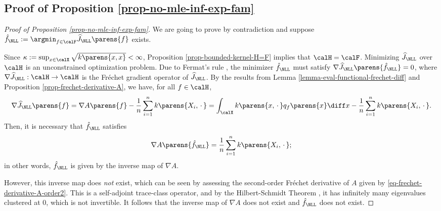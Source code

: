 \documentclass[12pt]{article}
\theoremstyle{definition}
\theoremstyle{theorem}
\theoremstyle{remark}
\begin{document}
\subsection{Proof of Proposition \ref{prop-no-mle-inf-exp-fam}}\label{subsection-proof-prop-no-mle-inf-exp-fam}

\begin{proof}[Proof of Proposition \ref{prop-no-mle-inf-exp-fam}]
	
	We are going to prove by contradiction and suppose $\hat{f}_{\NLL} := \argmin_{f \in \calF} \widehat{J}_{\NLL} \parens{f}$ exists. 
	
	Since $\kappa := \sup_{x \in \calX} \sqrt{k \parens{x, x}} < \infty$, Proposition \ref{prop-bounded-kernel-H=F} implies that $\calH = \calF$. Minimizing $\widehat{J}_{\NLL}$ over $\calH$ is an unconstrained optimization problem. Due to Fermat's rule \parencites[Theorem 16.3 in][]{Bauschke2017-he}, the minimizer $\hat{f}_{\NLL}$ must satisfy $\nabla \widehat{J}_{\NLL} \parens{\hat{f}_{\NLL}} = 0$, where $\nabla \widehat{J}_{\NLL}: \calH \to \calH$ is the Fr{\'e}chet gradient operator of $\widehat{J}_{\NLL}$. By the results from Lemma \ref{lemma-eval-functional-frechet-diff} and Proposition \ref{prop-frechet-derivative-A}, we have, for all $f \in \calH$, 
	\begin{align*}
		\nabla \widehat{J}_{\NLL} \parens{f} = \nabla A \parens{f} - \frac{1}{n} \sum_{i=1}^n k \parens{X_i, \,\cdot\,} = \int_{\calX} k \parens{x, \,\cdot\,} q_f \parens{x} \diff x - \frac{1}{n} \sum_{i=1}^n k \parens{X_i, \,\cdot\,}. 
	\end{align*}
	Then, it is necessary that $\hat{f}_{\NLL}$ satisfies 
	\begin{align}
		\nabla A \parens{\hat{f}_{\NLL}} = \frac{1}{n} \sum_{i=1}^n k \parens{X_i, \,\cdot\,}; 
	\end{align}
	in other words, $\hat{f}_{\NLL}$ is given by the inverse map of $\nabla A$. 
	
	However, this inverse map does \emph{not} exist, which can be seen by assessing the second-order Fr{\'e}chet derivative of $A$ given by \eqref{eq-frechet-derivative-A-order2}. This is a self-adjoint trace-class operator, and by the Hilbert-Schmidt Theorem \parencites[Section 16.6 in][]{Royden2018-cd}, it has infinitely many eigenvalues clustered at 0, which is not invertible. It follows that the inverse map of $\nabla A$ does not exist and $\hat{f}_{\NLL}$ does not exist. 
\end{proof}	


\printbibliography
\end{document}
